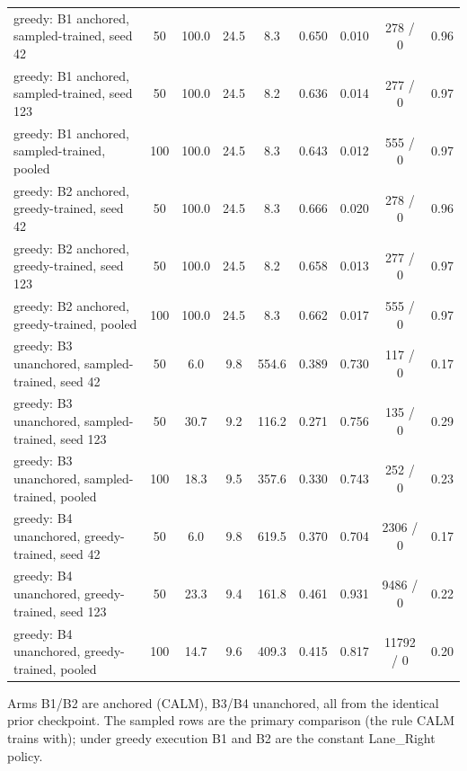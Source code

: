 \begin{table}[t]
{\begin{tabular}{lcccccccc}
\midrule
greedy: B1 anchored, sampled-trained, seed 42 & 50 & 100.0 & 24.5 & 8.3 & 0.650 & 0.010 & 278 / 0 & 0.96 \\
greedy: B1 anchored, sampled-trained, seed 123 & 50 & 100.0 & 24.5 & 8.2 & 0.636 & 0.014 & 277 / 0 & 0.97 \\
greedy: B1 anchored, sampled-trained, pooled & 100 & 100.0 & 24.5 & 8.3 & 0.643 & 0.012 & 555 / 0 & 0.97 \\
greedy: B2 anchored, greedy-trained, seed 42 & 50 & 100.0 & 24.5 & 8.3 & 0.666 & 0.020 & 278 / 0 & 0.96 \\
greedy: B2 anchored, greedy-trained, seed 123 & 50 & 100.0 & 24.5 & 8.2 & 0.658 & 0.013 & 277 / 0 & 0.97 \\
greedy: B2 anchored, greedy-trained, pooled & 100 & 100.0 & 24.5 & 8.3 & 0.662 & 0.017 & 555 / 0 & 0.97 \\
greedy: B3 unanchored, sampled-trained, seed 42 & 50 & 6.0 & 9.8 & 554.6 & 0.389 & 0.730 & 117 / 0 & 0.17 \\
greedy: B3 unanchored, sampled-trained, seed 123 & 50 & 30.7 & 9.2 & 116.2 & 0.271 & 0.756 & 135 / 0 & 0.29 \\
greedy: B3 unanchored, sampled-trained, pooled & 100 & 18.3 & 9.5 & 357.6 & 0.330 & 0.743 & 252 / 0 & 0.23 \\
greedy: B4 unanchored, greedy-trained, seed 42 & 50 & 6.0 & 9.8 & 619.5 & 0.370 & 0.704 & 2306 / 0 & 0.17 \\
greedy: B4 unanchored, greedy-trained, seed 123 & 50 & 23.3 & 9.4 & 161.8 & 0.461 & 0.931 & 9486 / 0 & 0.22 \\
greedy: B4 unanchored, greedy-trained, pooled & 100 & 14.7 & 9.6 & 409.3 & 0.415 & 0.817 & 11792 / 0 & 0.20 \\
\bottomrule
\end{tabular}}
\vspace{1mm}
\parbox{\textwidth}{\scriptsize Arms B1/B2 are anchored (CALM), B3/B4 unanchored, all from the identical prior checkpoint. The sampled rows are the primary comparison (the rule CALM trains with); under greedy execution B1 and B2 are the constant Lane\_Right policy.}
\end{table}
